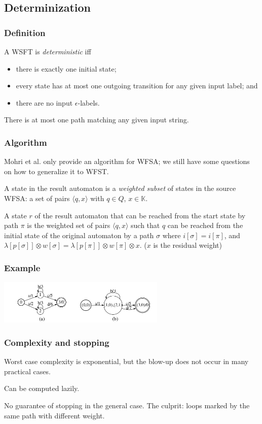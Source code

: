 \documentclass{beamer}
\newcommand{\<}{\langle}
\renewcommand{\>}{\rangle}
\begin{document}
\subsection{Determinization}
\begin{frame}
  \frametitle{Definition}
  
  A WSFT is {\em deterministic} iff
  \begin{itemize}
  \item there is exactly one initial state;
  \item every state has at most one outgoing transition for any given
    input label; and
  \item there are no input $\epsilon$-labels.
  \end{itemize}

  There is at most one path matching any given input string.
\end{frame}

\begin{frame}
  \frametitle{Algorithm}

  Mohri et al. only provide an algorithm for WFSA; we still have some
  questions on how to generalize it to WFST.

  A state in the result automaton is a {\em weighted subset} of
  states in the source WFSA: a set of pairs $\<q, x\>$ with $q \in Q$,
  $x \in \mathbb{K}$.

  A state $r$ of the result automaton that can be reached from the
  start state by path $\pi$ is the weighted set of pairs $\<q, x\>$
  such that $q$ can be reached from the initial state of the original
  automaton by a path $\sigma$ where $i[\sigma] = i[\pi]$, and 
  $\lambda[p[\sigma]] \otimes w[\sigma] = \lambda[p[\pi]] \otimes
  w[\pi] \otimes x$. ($x$ is the residual weight)
\end{frame}

\begin{frame}
  \frametitle{Example}

  \includegraphics[width=8cm]{determinization-example.png}  
\end{frame}

\begin{frame}
  \frametitle{Complexity and stopping}
  
  Worst case complexity is exponential, but the blow-up does not occur
  in many practical cases.
  
  Can be computed lazily.

  No guarantee of stopping in the general case. The culprit: loops
  marked by the same path with different weight.

\end{frame}
\end{document}
